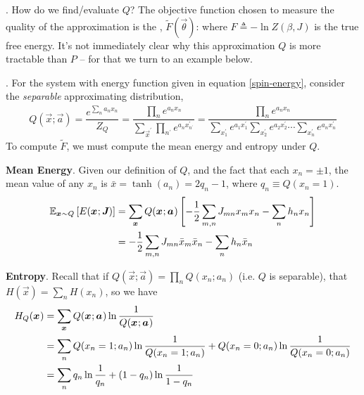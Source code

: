 \documentclass[11pt]{article}
\begin{document}
\myspace 
\p {}. How do we find/evaluate $Q$? The objective function chosen to measure the quality of the approximation is the , $\widetilde F(\vec{\theta})$:
where $F \triangleq - \ln Z(\beta, J)$ is the true free energy. It's not immediately clear why this approximation $Q$ is more tractable than $P$ -- for that we turn to an example below.

\myspace
\p {}. For the system with energy function given in equation \ref{spin-energy}, consider the \textit{separable} approximating distribution,
\begin{align}
	Q(\vec x; \vec a) = \dfrac{   e^{\sum_n a_n x_n}  }{  Z_Q  } 
	= \dfrac{ \prod_{n} e^{a_n x_n} }{ \sum_{\vec{x}^{\prime}} \prod_{n^{\prime}} e^{a_n x^{\prime}_{n^\prime}} } 
	=  \dfrac{ \prod_{n} e^{a_n x_n} }{
		 \sum_{x^{\prime}_1} e^{a_1 x^{\prime}_1} \sum_{x^{\prime}_2} e^{a_2 x^{\prime}_2}  \cdots \sum_{x^{\prime}_n} e^{a_n x^{\prime}_n} 
	} 
\end{align}
To compute $\widetilde F$, we must compute the mean energy and entropy under $Q$.
\begin{compactitem}[$\rightarrow$]
	
	\item \textbf{Mean Energy}. Given our definition of $Q$, and the fact that each $x_n = \pm 1$, the mean value of any $x_n$ is $\bar{x} = \tanh(a_n) = 2 q_n - 1$, where $q_n \equiv Q(x_n = 1)$. 
	\begin{align}
		\E[\vec x \sim Q]{E(\vec x; \matr J)}
		&= \sum_{\vec{x}} Q(\vec x; \vec a) \left[ 
			-\onehalf \sum_{m,n} J_{mn} x_m x_n - \sum_n h_n x_n
		\right] \\
		&= -\onehalf \sum_{m,n} J_{mn} \bar x_m \bar x_n - \sum_n h_n \bar x_n
	\end{align}
	
	\item \textbf{Entropy}. Recall that if $Q(\vec x; \vec a) = \prod_n Q(x_n; a_n)$ (i.e. $Q$ is separable), that $H(\vec{x}) = \sum_n H(x_n)$, so we have
	\begin{align}
	H_Q(\vec{x}) &= \sum_{\vec{x}} Q(\vec x; \vec a) \ln \inv{Q(\vec x; \vec a)} \\
		&= \sum_n Q(x_n = 1; a_n) \ln \inv{Q(x_n = 1; a_n)} +   Q(x_n = 0; a_n) \ln \inv{ Q(x_n = 0; a_n)} \\
		&= \sum_n q_n \ln \inv{q_n} +  (1 - q_n) \ln \inv{ 1 - q_n }
	\end{align}
\end{compactitem}
\end{document}

